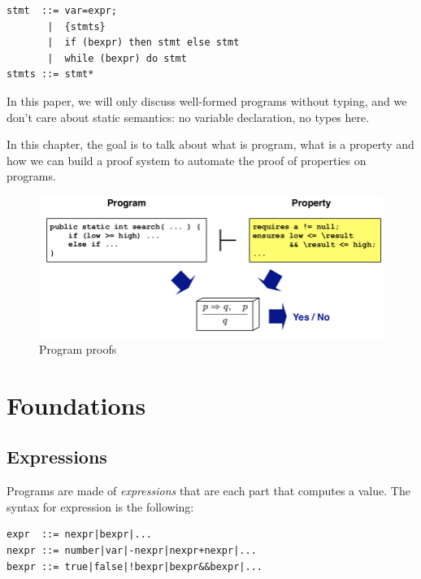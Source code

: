 \documentclass[12pt, a4paper]{book}
\begin{document}
\begin{verbatim}
stmt  ::= var=expr;
       |  {stmts}
       |  if (bexpr) then stmt else stmt
       |  while (bexpr) do stmt
stmts ::= stmt*
\end{verbatim}

In this paper, we will only discuss well-formed programs without typing, and we
don't care about static semantics: no variable declaration, no types here.
\newline

In this chapter, the goal is to talk about what is program, what is a property
and how we can build a proof system to automate the proof of properties on
programs.

  \begin{figure}[!ht]
      \includegraphics[width=\linewidth]{program_proofs.png}
      \caption{Program proofs}
  \end{figure}
  \section{Foundations}
  \label{sec:Foundations}

\subsection{Expressions}
\label{sub:Expressions}


Programs are made of \textit{expressions} that are each part that computes a
value. The syntax for expression is the following:

\begin{verbatim}
expr  ::= nexpr|bexpr|...
nexpr ::= number|var|-nexpr|nexpr+nexpr|...
bexpr ::= true|false|!bexpr|bexpr&&bexpr|...
\end{verbatim}
\end{document}

